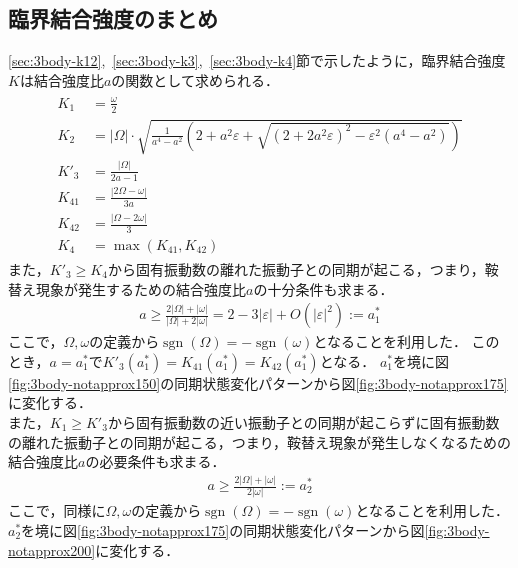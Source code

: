 \documentclass[../main]{subfiles}
\begin{document}
    \subsection{臨界結合強度のまとめ}
    \label{sec:3body-summary}
    \ref{sec:3body-k12},\ \ref{sec:3body-k3},\ \ref{sec:3body-k4}節で示したように，臨界結合強度$K$は結合強度比$a$の関数として求められる．
    \begin{align}
        \label{eq:3body-matome}
        \begin{split}
            K_1&=\frac{\omega}{2}\\
            K_2&=|\Omega|\cdot\sqrt{\frac{1}{a^4-a^2}\left(2+a^2\varepsilon+\sqrt{(2+2a^2\varepsilon)^2-\varepsilon^2(a^4-a^2)}\right)}\\
            K'_3&=\frac{|\Omega|}{2a-1}\\
            K_{41}&=\frac{|2\Omega-\omega|}{3a}\\
            K_{42}&=\frac{|\Omega-2\omega|}{3}\\
            K_4&=\max\left(K_{41},K_{42}\right)
        \end{split}
    \end{align}
    また，$K'_3\geq K_4$から固有振動数の離れた振動子との同期が起こる，つまり，鞍替え現象が発生するための結合強度比$a$の十分条件も求まる．
    \begin{align*}
        a\geq \frac{2|\Omega|+|\omega|}{|\Omega|+2|\omega|}= 2-3|\varepsilon|+O(|\varepsilon|^2):=a^\ast_1    
    \end{align*}
    ここで，$\Omega,\omega$の定義から$\operatorname{sgn}(\Omega)=-\operatorname{sgn}(\omega)$となることを利用した．
    このとき，$a=a^\ast_1$で$K'_{3}(a^\ast_1)=K_{41}(a^\ast_1)=K_{42}(a^\ast_1)$となる．
    $a^\ast_1$を境に図\ref{fig:3body-notapprox150}の同期状態変化パターンから図\ref{fig:3body-notapprox175}に変化する．\\
    また，$K_1\geq K'_3$から固有振動数の近い振動子との同期が起こらずに固有振動数の離れた振動子との同期が起こる，つまり，鞍替え現象が発生しなくなるための結合強度比$a$の必要条件も求まる．
    \begin{align*}
        a\geq \frac{2|\Omega|+|\omega|}{2|\omega|}:=a^\ast_2    
    \end{align*}
    ここで，同様に$\Omega,\omega$の定義から$\operatorname{sgn}(\Omega)=-\operatorname{sgn}(\omega)$となることを利用した．
    $a^\ast_2$を境に図\ref{fig:3body-notapprox175}の同期状態変化パターンから図\ref{fig:3body-notapprox200}に変化する．
\end{document}
